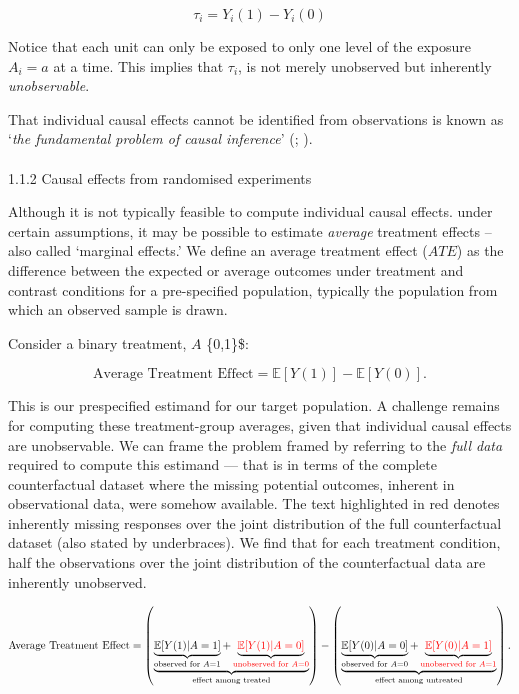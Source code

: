 \documentclass[
  single column]{article}
\makeatletter
\let\oldparagraph\paragraph
\renewcommand{\paragraph}{
    \@ifstar
      \xxxParagraphStar
      \xxxParagraphNoStar
  }
\newcommand{\xxxParagraphStar}[1]{\oldparagraph*{#1}\mbox{}}
\newcommand{\xxxParagraphNoStar}[1]{\oldparagraph{#1}\mbox{}}
\makeatother
\begin{document}
\[
\tau_i = Y_i(1) - Y_i(0)
\]

Notice that each unit can only be exposed to only one level of the
exposure \(A_i = a\) at a time. This implies that \(\tau_i\), is not
merely unobserved but inherently \emph{unobservable}.

That individual causal effects cannot be identified from observations is
known as `\emph{the fundamental problem of causal inference}'
(;
).

\paragraph{1.1.2 Causal effects from randomised
experiments}\label{causal-effects-from-randomised-experiments}

Although it is not typically feasible to compute individual causal
effects. under certain assumptions, it may be possible to estimate
\emph{average} treatment effects -- also called `marginal effects.' We
define an average treatment effect (\(ATE\)) as the difference between
the expected or average outcomes under treatment and contrast conditions
for a pre-specified population, typically the population from which an
observed sample is drawn.

Consider a binary treatment, \(A\) \in \{0,1\}\$:

\[
\text{Average Treatment Effect}  = \mathbb{E}[Y(1)] - \mathbb{E}[Y(0)].
\]

This is our prespecified estimand for our target population. A challenge
remains for computing these treatment-group averages, given that
individual causal effects are unobservable. We can frame the problem
framed by referring to the \emph{full data} required to compute this
estimand --- that is in terms of the complete counterfactual dataset
where the missing potential outcomes, inherent in observational data,
were somehow available. The text highlighted in red denotes inherently
missing responses over the joint distribution of the full counterfactual
dataset (also stated by underbraces). We find that for each treatment
condition, half the observations over the joint distribution of the
counterfactual data are inherently unobserved.

\[
\text{Average Treatment Effect} = \left(\underbrace{\underbrace{\mathbb{E}[Y(1)|A = 1]}_{\text{observed for } A = 1} + \underbrace{\textcolor{red}{\mathbb{E}[Y(1)|A = 0]}}_{\textcolor{red}{\text{unobserved for } A = 0}}}_{\text{effect among treated}}\right) - \left(\underbrace{\underbrace{\mathbb{E}[Y(0)|A = 0]}_{\text{observed for } A = 0} + \underbrace{\textcolor{red}{\mathbb{E}[Y(0)|A = 1]}}_{\textcolor{red}{\text{unobserved for } A = 1}}}_{\text{effect among untreated}}\right).
\]
\end{document}
